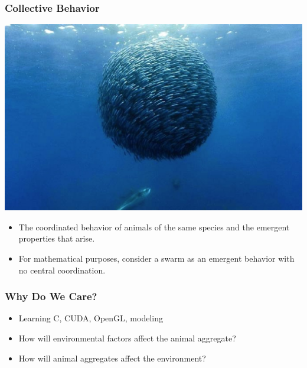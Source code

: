 \documentclass[xcolor=dvipsnames]{beamer}
\begin{document}
\begin{frame}
	\frametitle{Collective Behavior}
	\begin{center}
	\includegraphics[scale=0.05]{images/fish_schoo.jpg}
	\end{center}
	\begin{itemize}
		\item The coordinated behavior of animals of the same species and the emergent properties that arise.
		\pause
		\item For mathematical purposes, consider a swarm as an emergent behavior with no central coordination.
	\end{itemize}
\end{frame}

\begin{frame}
	\frametitle{Why Do We Care?}
	\begin{itemize}
		\item Learning C, CUDA, OpenGL, modeling
		\item How will environmental factors affect the animal aggregate?
		\item How will animal aggregates affect the environment?
	\end{itemize}
\end{frame}
\end{document}
